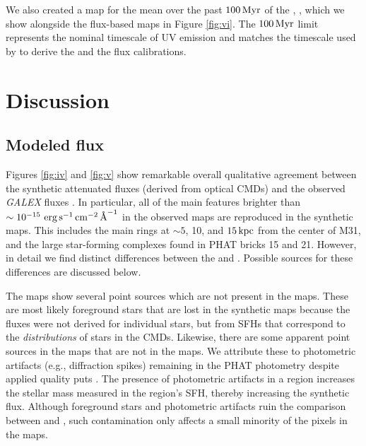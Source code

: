 \documentclass[iop, tighten]{emulateapj}
\begin{document}
\tabiii

We also created a map for the mean \sfr{} over the past $100\,\mathrm{Myr}$ of the
, \sfroneh{}, which we show alongside the flux-based \sfr{} maps in
Figure \ref{fig:vi}. The $100\,\mathrm{Myr}$ limit represents the nominal timescale of UV
emission and matches the timescale used by \citet{Hao:2011} to derive the \fuv{}
and the \nuv{} flux calibrations.





\section{Discussion}\label{discussion}



\subsection{Modeled flux}\label{discussion:modflux}

Figures \ref{fig:iv} and \ref{fig:v} show remarkable overall qualitative
agreement between the synthetic attenuated fluxes \fxsfh{} (derived from optical
CMDs) and the observed \emph{GALEX} fluxes \fxobs{}. In particular, all of the
main features brighter than $\sim 10^{-15}\, \,\mathrm{erg}\,\mathrm{s}^{-1}\,\mathrm{cm}^{-2}\,\textrm{\AA}^{-1}$ in the observed maps are
reproduced in the synthetic maps. This includes the main rings at $\sim 5$, 10,
and $15\,\mathrm{kpc}$ from the center of M31, and the large star-forming complexes found
in PHAT bricks 15 and 21. However, in detail we find distinct differences
between the \fxsfh{} and \fxobs{}. Possible sources for these differences are
discussed below.

The \fxobs{} maps show several point sources which are not present in the
\fxsfh{} maps. These are most likely foreground stars that are lost in the
synthetic maps because the fluxes were not derived for individual stars, but
from SFHs that correspond to the \emph{distributions} of stars in the CMDs.
Likewise, there are some apparent point sources in the \fxsfh{} maps that are
not in the \fxobs{} maps. We attribute these to photometric artifacts (e.g.,
diffraction spikes) remaining in the PHAT photometry despite applied quality
puts \citep{Dalcanton:2012}. The presence of photometric artifacts in a region
increases the stellar mass measured in the region's SFH, thereby increasing the
synthetic flux. Although foreground stars and photometric artifacts ruin the
comparison between \fxsfh{} and \fxobs{}, such contamination only affects a
small minority of the pixels in the maps.
\end{document}
